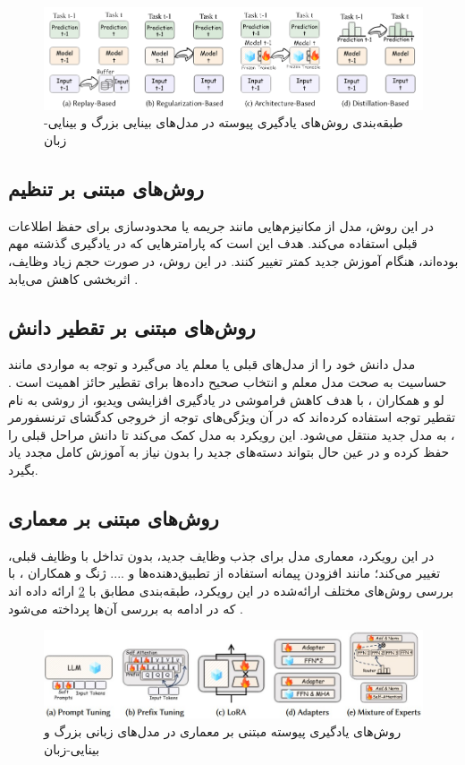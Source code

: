 \begin{figure}
\centering\includegraphics[scale=.45]{Images/Chapter2/llm_methods.png}
\caption[]{طبقه‌بندی روش‌های یادگیری پیوسته در مدل‌های بینایی بزرگ و بینایی-زبان  \protect\cite{llm_continual}}
\label{fig.21}
\end{figure}


\subsection{روش‌های مبتنی بر تنظیم}
در این روش، مدل از مکانیزم‌هایی مانند جریمه یا محدودسازی برای حفظ اطلاعات قبلی استفاده می‌کند. هدف این است که پارامتر‌هایی که در یادگیری گذشته مهم بوده‌اند، هنگام آموزش جدید کمتر تغییر کنند. در این روش، در صورت حجم زیاد وظایف، اثربخشی کاهش می‌یابد
\cite{llm_continual}
.

\subsection{روش‌های مبتنی بر تقطیر دانش}
مدل دانش خود را از مدل‌های قبلی یا معلم یاد می‌گیرد و توجه به مواردی مانند حساسیت به صحت مدل معلم و انتخاب صحیح داده‌ها برای تقطیر حائز اهمیت است
\cite{llm_continual}.
لو و همکاران 
\cite{distillation}،
با هدف کاهش فراموشی در یادگیری افزایشی ویدیو، از روشی به نام تقطیر توجه  استفاده کرده‌اند که در آن ویژگی‌های توجه از خروجی کدگشای ترنسفورمر ، به مدل جدید منتقل می‌شود. این رویکرد به مدل کمک می‌کند تا دانش مراحل قبلی را حفظ کرده و در عین حال بتواند دسته‌های جدید را بدون نیاز به آموزش کامل مجدد یاد بگیرد. 


\subsection{روش‌های مبتنی بر معماری}
در این رویکرد، معماری مدل برای جذب وظایف جدید، بدون تداخل با وظایف قبلی، تغییر می‌کند؛ مانند افزودن پیمانه
 استفاده از تطبیق‌دهنده‌ها و .... 
 ژنگ و همکاران
\cite{llm_continual}،
با بررسی روش‌های مختلف ارائه‌شده در این رویکرد، طبقه‌بندی مطابق با 
\cref{fig.22}
ارائه داده اند که در ادامه به بررسی آن‌ها پرداخته‌ می‌شود
.
\begin{figure}
\centering\includegraphics[scale=.75]{Images/Chapter2/llm_architec_methods.jpg}
\caption[]{ روش‌های یادگیری پیوسته مبتنی بر معماری در مدل‌های زبانی بزرگ و بینایی-زبان \protect\cite{llm_continual}}
\label{fig.22}
\end{figure}

